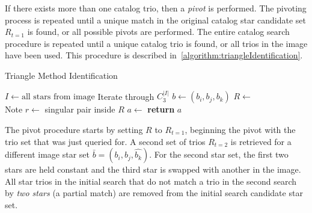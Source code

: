 If there exists more than one catalog trio, then a \textit{pivot} is performed.
The pivoting process is repeated until a unique match in the original catalog star candidate set $R_{t=1}$ is found,
or all possible pivots are performed.
The entire catalog search procedure is repeated until a unique catalog trio is found, or all trios in the image have
been used.
This procedure is described in~\autoref{algorithm:triangleIdentification}.

\begin{algorithm}
    \caption{Triangle Method Identification} \label{algorithm:triangleIdentification}
    \begin{algorithmic}[1]
        \State $I \gets \text{all stars} \text{ from image}$
          \Comment Iterate through $C^{|I|}_3$
        \State $b \gets (b_i, b_j, b_k)$
        \State $R \gets$ 
        \\
        Note
        \State $r \gets $ singular pair inside $R$
        \State $a \gets $ 
        \State \textbf{return} $a$
        \EndIf
        \EndFor
        \EndFor
        \EndFor
        \EndProcedure
    \end{algorithmic}
\end{algorithm}

The pivot procedure starts by setting $R$ to $R_{t=1}$, beginning the pivot with the trio set that was just queried
for.
A second set of trios $R_{t=2}$ is retrieved for a different image star set $\bar{b} = (b_i, b_j, \hat{b_k})$.
For the second star set, the first two stars are held constant and the third star is swapped with another in the image.
All star trios in the initial search that do not match a trio in the second search by \textit{two stars} (a partial
match) are removed from the initial search candidate star set.

